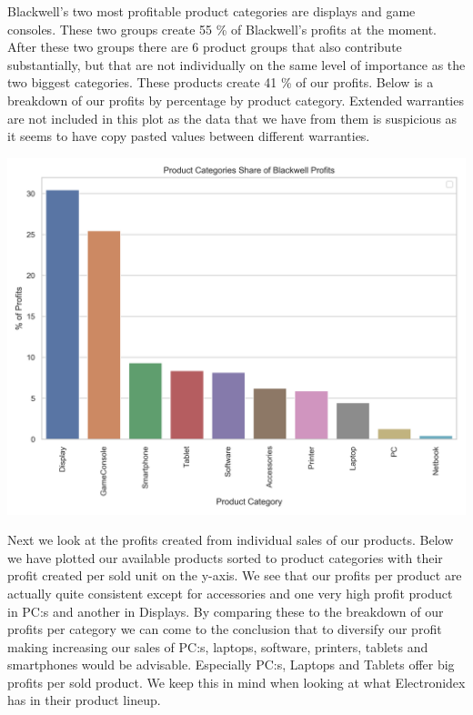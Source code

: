 \documentclass[12pt,a4paper,leqno]{report}
\theoremstyle{plain}
\theoremstyle{definition}
\theoremstyle{remark}
\begin{document}
Blackwell's two most profitable product categories are displays and game consoles. These two groups
create 55 \% of Blackwell's profits at the moment. After these two groups
there are 6 product groups that also contribute substantially, but that are not individually on the same
level of importance as the two biggest categories. These products create 41 \% of our profits.
Below is a breakdown of our profits by percentage by product category. Extended warranties are not included
in this plot as the data that we have from them is suspicious as it seems to have copy pasted values
between different warranties.

\bigskip
{
    \centering
    \includegraphics[width=\textwidth,height=\textheight,keepaspectratio]{blackwell_profits_share_by_product_category.png}
    \par
}
\bigskip

Next we look at the profits created from individual sales of our products. Below we have plotted our available
products sorted to product categories with their profit created per sold unit on the y-axis.
We see that our profits per product are actually quite consistent except for accessories
and one very high profit product in PC:s and another in Displays.
By comparing these to the breakdown of our profits per category we can come to the conclusion that to diversify
our profit making increasing our sales of PC:s, laptops, software, printers, tablets and smartphones would be
advisable. Especially PC:s, Laptops and Tablets offer big profits per sold product. We keep this in mind
when looking at what Electronidex has in their product lineup.
\end{document}
